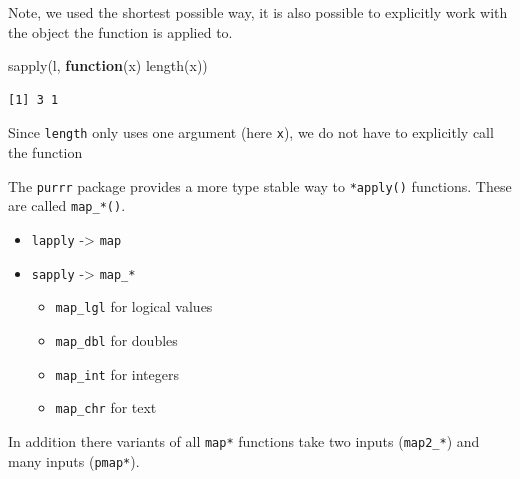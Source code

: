 \documentclass[ignorenonframetext,,t]{beamer}
\let\oldtextbf\textbf
\renewcommand{\textbf}[1]{\textcolor{spamwell}{\oldtextbf{#1}}}
\providecommand{\tightlist}{%
\setlength{\itemsep}{0pt}\setlength{\parskip}{0pt}}
\newenvironment{Shaded}{\begin{snugshade}}{\end{snugshade}}
\newcommand{\ControlFlowTok}[1]{\textcolor[rgb]{0.13,0.29,0.53}{\textbf{#1}}}
\newcommand{\FunctionTok}[1]{\textcolor[rgb]{0.00,0.00,0.00}{#1}}
\newcommand{\NormalTok}[1]{#1}
\providecommand{\tightlist}{%
\setlength{\itemsep}{0pt}\setlength{\parskip}{0pt}}
\renewcommand{\tightlist}{\setlength{\itemsep}{1.4ex}\setlength{\parskip}{0pt}}
\begin{document}
\begin{frame}[fragile]
Note, we used the shortest possible way, it is also possible to
explicitly work with the object the function is applied to.

\begin{Shaded}
\begin{Highlighting}[]
\FunctionTok{sapply}\NormalTok{(l, }\ControlFlowTok{function}\NormalTok{(x) }\FunctionTok{length}\NormalTok{(x))}
\end{Highlighting}
\end{Shaded}

\begin{verbatim}
[1] 3 1
\end{verbatim}

Since \texttt{length} only uses one argument (here \texttt{x}), we do
not have to explicitly call the function
\end{frame}

\begin{frame}[fragile]
The \texttt{purrr} package provides a more type stable way to
\texttt{*apply()} functions. These are called \texttt{map\_*()}.

\begin{itemize}
\tightlist
\item
  \texttt{lapply} -\textgreater{} \texttt{map}
\item
  \texttt{sapply} -\textgreater{} \texttt{map\_*}

  \begin{itemize}
  \tightlist
  \item
    \texttt{map\_lgl} for logical values
  \item
    \texttt{map\_dbl} for doubles
  \item
    \texttt{map\_int} for integers
  \item
    \texttt{map\_chr} for text
  \end{itemize}
\end{itemize}

In addition there variants of all \texttt{map*} functions take two
inputs (\texttt{map2\_*}) and many inputs (\texttt{pmap*}).
\end{frame}
\end{document}
